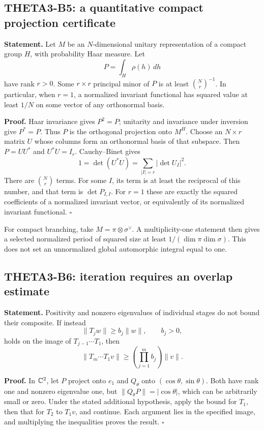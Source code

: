 \documentclass[11pt]{article}
\theoremstyle{definition}\newtheorem{definition}[theorem]{Definition}\newtheorem{remark}[theorem]{Remark}
\begin{document}
\subsection{THETA3-B5: a quantitative compact projection certificate}\label{B5}

\textbf{Statement.} Let $M$ be an $N$-dimensional unitary representation of a compact group $H$, with probability Haar measure. Let
\[
 P=\int_H\rho(h)\,dh
\]
have rank $r>0$. Some $r\times r$ principal minor of $P$ is at least $\binom Nr^{-1}$. In particular, when $r=1$, a normalized invariant functional has squared value at least $1/N$ on some vector of any orthonormal basis.

\textbf{Proof.} Haar invariance gives $P^2=P$; unitarity and invariance under inversion give $P^*=P$. Thus $P$ is the orthogonal projection onto $M^H$. Choose an $N\times r$ matrix $U$ whose columns form an orthonormal basis of that subspace. Then $P=UU^*$ and $U^*U=I_r$. Cauchy--Binet gives
\[
 1=\det(U^*U)=\sum_{|I|=r}|\det U_I|^2.
\]
There are $\binom Nr$ terms. For some $I$, its term is at least the reciprocal of this number, and that term is $\det P_{I,I}$. For $r=1$ these are exactly the squared coefficients of a normalized invariant vector, or equivalently of its normalized invariant functional. \hfill$\square$

For compact branching, take $M=\pi\otimes\sigma^\vee$. A multiplicity-one statement then gives a selected normalized period of squared size at least $1/(\dim\pi\dim\sigma)$. This does not set an unnormalized global automorphic integral equal to one.

\subsection{THETA3-B6: iteration requires an overlap estimate}\label{B6}

\textbf{Statement.} Positivity and nonzero eigenvalues of individual stages do not bound their composite. If instead
\[
 \|T_jw\|\geq b_j\|w\|,\qquad b_j>0,
\]
holds on the image of $T_{j-1}\cdots T_1$, then
\[
 \|T_m\cdots T_1v\|\geq\left(\prod_{j=1}^m b_j\right)\|v\|.
\]

\textbf{Proof.} In $\mathbb C^2$, let $P$ project onto $e_1$ and $Q_\theta$ onto $(\cos\theta,\sin\theta)$. Both have rank one and nonzero eigenvalue one, but $\|Q_\theta P\|=|\cos\theta|$, which can be arbitrarily small or zero. Under the stated additional hypothesis, apply the bound for $T_1$, then that for $T_2$ to $T_1v$, and continue. Each argument lies in the specified image, and multiplying the inequalities proves the result. \hfill$\square$
\end{document}
